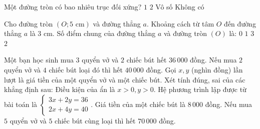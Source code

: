 \begin{ex}%
	Một đường tròn có bao nhiêu trục đối xứng?
	\choice
	{$1$}
	{$2$}
	{\True Vô số}
	{Không có}
\end{ex}

\begin{ex}%
	Cho đường tròn $(O; 5\text{ cm})$ và đường thẳng $a$. Khoảng cách từ tâm $O$ đến đường thẳng $a$ là $3\text{ cm}$. Số điểm chung của đường thẳng $a$ và đường tròn $(O)$ là:
	\choice
	{$0$}
	{$1$}
	{$3$}
	{\True $2$}
\end{ex}

\begin{ex}%
	Một bạn học sinh mua $3$ quyển vở và $2$ chiếc bút hết $36\,000$ đồng. Nếu mua $2$ quyển vở và $4$ chiếc bút loại đó thì hết $40\,000$ đồng. Gọi $x, y$ (nghìn đồng) lần lượt là giá tiền của một quyển vở và một chiếc bút. Xét tính đúng, sai của các khẳng định sau:
	\choiceTF
	{\True Điều kiện của ẩn là $x > 0, y > 0$.}
	{\True Hệ phương trình lập được từ bài toán là $\begin{cases} 3x + 2y = 36 \\ 2x + 4y = 40 \end{cases}$.}
	{Giá tiền của một chiếc bút là $8\,000$ đồng.}
	{\True Nếu mua $5$ quyển vở và $5$ chiếc bút cùng loại thì hết $70\,000$ đồng.}
\end{ex}

